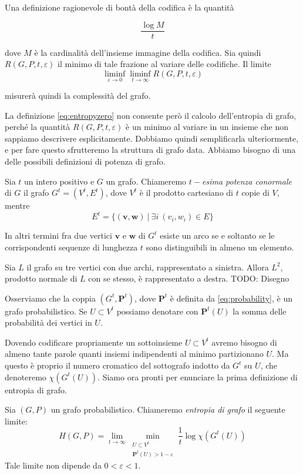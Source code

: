 Una definizione ragionevole di bontà della codifica è la quantità

\[\frac{\log{M}}{t}\]

dove \(M\) è la cardinalità dell'insieme immagine della codifica. Sia quindi \(R(G,P,t,\varepsilon)\) il minimo di tale frazione al variare delle codifiche. Il limite 
\begin{equation}
	\label{eq:entropyzero} \liminf_{\varepsilon \to 0} \liminf_{t \to \infty} R(G,P,t,\varepsilon) 
\end{equation}

misurerà quindi la complessità del grafo.

La definizione \eqref{eq:entropyzero} non consente però il calcolo dell'entropia di grafo, perché la quantità \(R(G,P,t,\varepsilon)\) è un minimo al variare in un insieme che non sappiamo descrivere esplicitamente. Dobbiamo quindi semplificarla ulteriormente, e per fare questo sfrutteremo la struttura di grafo data. Abbiamo bisogno di una delle possibili definizioni di potenza di grafo. 
\begin{definition}
	Sia \(t\) un intero positivo e \(G\) un grafo. Chiameremo \emph{\(t-\)esima potenza conormale} di \(G\) il grafo \(G^t=(V^t, E^t)\), dove \(V^t\) è il prodotto cartesiano di \(t\) copie di \(V\), mentre
	\[E^t=\{(\mathbf{v},\mathbf{w})\ \vert\ \exists i\ (v_i, w_i)\in E\}\]
\end{definition}

In altri termini fra due vertici \(\mathbf{v}\) e \(\mathbf{w}\) di \(G^t\) esiste un arco se e soltanto se le corrispondenti sequenze di lunghezza \(t\) sono distinguibili in almeno un elemento.

\begin{example}
  Sia \(L\) il grafo su tre vertici con due archi, rappresentato a sinistra. Allora \(L^2\), prodotto normale di \(L\) con se stesso, è rappresentato a destra.
  TODO: Disegno
\end{example}
Osserviamo che la coppia \((G^t, \mathbf{P}^t)\), dove \(\mathbf{P}^t\) è definita da \eqref{eq:probability}, è un grafo probabilistico. Se \(U\subset V^{t}\) possiamo denotare con \(\mathbf{P}^t(U)\) la somma delle probabilità dei vertici in \(U\).

Dovendo codificare propriamente un sottoinsieme \(U\subset V^{t}\) avremo bisogno di almeno tante parole quanti insiemi indipendenti al minimo partizionano \(U\). Ma questo è proprio il numero cromatico del sottografo indotto da \(G^t\) su \(U\), che denoteremo \(\chi(G^t(U))\). Siamo ora pronti per enunciare la prima definizione di entropia di grafo. 
\begin{definition}
	Sia \((G,P)\) un grafo probabilistico. Chiameremo \emph{entropia di grafo} il seguente limite: 
	\begin{equation}
		\label{eq:entropyone} H(G,P)=\lim_{t\to \infty} \min_{\substack{ U\subset V^t\\\mathbf{P}^t(U)>1-\varepsilon}} \frac{1}{t}\log{\chi(G^t(U))} 
	\end{equation}
	Tale limite non dipende da \(0<\varepsilon <1\). 
\end{definition}

